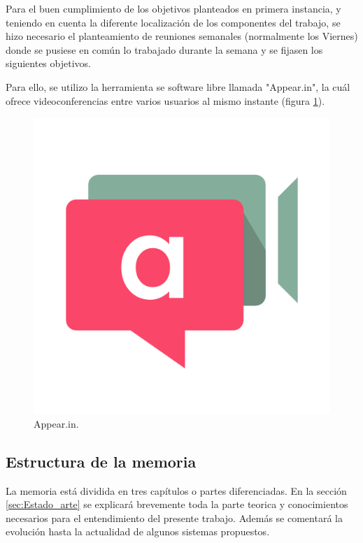 Para el buen cumplimiento de los objetivos planteados en primera instancia, y teniendo en cuenta la diferente localización de los componentes del trabajo, se hizo necesario el planteamiento de reuniones semanales (normalmente los Viernes) donde se pusiese en común lo trabajado durante la semana y se fijasen los siguientes objetivos. \newline

Para ello, se utilizo la herramienta se software libre llamada "Appear.in", la cuál ofrece videoconferencias entre varios usuarios al mismo instante (figura \ref{fig:appear}). 

\begin{figure}[H]
	\center
	\includegraphics[trim = 0mm 0mm 0mm 0mm, clip,scale=0.3]{imagenes/Introduction/appear}
	\caption{Appear.in.}
	\label{fig:appear}
\end{figure}

\subsection{Estructura de la memoria}

La memoria está dividida en tres capítulos o partes diferenciadas. \newline
En la sección \ref{sec:Estado_arte} se explicará brevemente toda la parte teorica y conocimientos necesarios para el entendimiento del presente trabajo. Además se comentará la evolución hasta la actualidad de algunos sistemas propuestos.\newline


